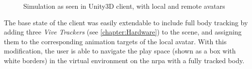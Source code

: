 \begin{figure}[h]
    \centering
    \hfill
    \caption{Simulation as seen in Unity3D client, with local and remote avatars}
    \label{fig:unityClientLocalRemote}
\end{figure}

The base state of the client was easily extendable to include full body tracking by adding three \textit{Vive Trackers} (see \autoref{chapter:Hardware}) to the scene, and assigning them to the corresponding animation targets of the local avatar. 
\newline
With this modification, the user is able to navigate the play space (shown as a box with white borders) in the virtual environment on the \gls{nrpa} with a fully tracked body.